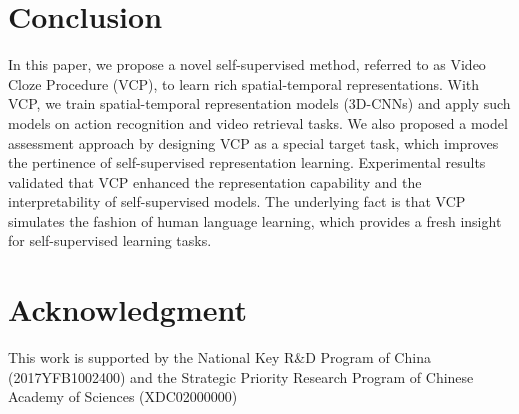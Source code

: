 \documentclass[letterpaper]{article}
\begin{document}
\begin{table}
\caption{Video retrieval performance on HMDB51.}
    \label{fig:retrieval hmdb}
\end{table}
 
\section{Conclusion}
In this paper, we propose a novel self-supervised method, referred to as Video Cloze Procedure (VCP), to learn rich spatial-temporal representations. 
 With VCP, we train spatial-temporal representation models (3D-CNNs) and apply such models on action recognition and video retrieval tasks. 
 We also proposed a model assessment approach by designing VCP as a special target task, which improves the pertinence of self-supervised representation learning. 
 Experimental results validated that VCP enhanced the representation capability and the interpretability of self-supervised models. The underlying fact is that VCP simulates the fashion of human language learning, which provides a fresh insight for self-supervised learning tasks.

\section*{Acknowledgment}
This work is supported by the National Key R\&D Program of China
(2017YFB1002400)
and the Strategic Priority Research Program of Chinese Academy of Sciences
(XDC02000000)




\end{document}
